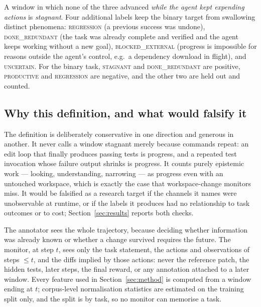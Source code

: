 \noindent A window in which none of the three advanced \emph{while the agent kept expending actions} is
\emph{stagnant}. Four additional labels keep the binary target from swallowing distinct phenomena:
\textsc{regression} (a previous success was undone), \textsc{done\_redundant} (the task was already
complete and verified and the agent keeps working without a new goal), \textsc{blocked\_external}
(progress is impossible for reasons outside the agent's control, e.g.\ a dependency download in
flight), and \textsc{uncertain}. For the binary task, \textsc{stagnant} and \textsc{done\_redundant} are
positive, \textsc{productive} and \textsc{regression} are negative, and the other two are held out and
counted.

\subsection{Why this definition, and what would falsify it}
The definition is deliberately conservative in one direction and generous in another. It never calls a
window stagnant merely because commands repeat: an edit loop that finally produces passing tests is
progress, and a repeated test invocation whose failure output shrinks is progress. It counts purely
epistemic work --- looking, understanding, narrowing --- as progress even with an untouched workspace,
which is exactly the case that workspace-change monitors miss. It would be falsified as a research target
if the channels it names were unobservable at runtime, or if the labels it produces had no relationship to
task outcomes or to cost; Section~\ref{sec:results} reports both checks.

The annotator sees the whole trajectory, because deciding whether information was already known or whether
a change survived requires the future. The monitor, at step $t$, sees only the task statement, the actions
and observations of steps $\le t$, and the diffs implied by those actions: never the reference patch, the
hidden tests, later steps, the final reward, or any annotation attached to a later window. Every feature
used in Section~\ref{sec:method} is computed from a window ending at $t$; corpus-level normalisation
statistics are estimated on the training split only, and the split is by task, so no monitor can memorise a
task.
